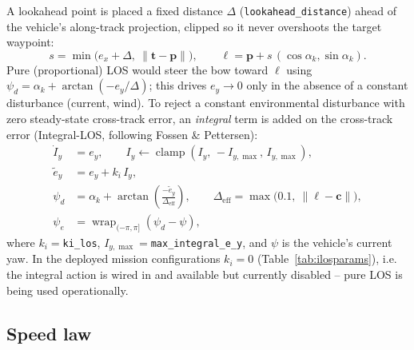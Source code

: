 A lookahead point is placed a fixed distance $\Delta$ (\texttt{lookahead\_distance}) ahead of the vehicle's along-track projection, clipped so it never overshoots the target waypoint:
\begin{equation}
s = \min\!\big(e_x + \Delta,\ \|\mathbf{t}-\mathbf{p}\|\big), \qquad \mathbf{\ell} = \mathbf{p} + s\,(\cos\alpha_k,\sin\alpha_k).
\end{equation}
Pure (proportional) LOS would steer the bow toward $\boldsymbol\ell$ using $\psi_d = \alpha_k + \arctan(-e_y/\Delta)$; this drives $e_y\to 0$ only in the absence of a constant disturbance (current, wind). To reject a constant environmental disturbance with zero steady-state cross-track error, an \emph{integral} term is added on the cross-track error (Integral-LOS, following Fossen \& Pettersen):
\begin{align}
\dot I_y &= e_y, \qquad I_y \leftarrow \operatorname{clamp}(I_y,\, -I_{y,\max},\, I_{y,\max}), \label{eq:ilosint}\\
\tilde e_y &= e_y + k_i\, I_y, \label{eq:ilosaug}\\
\psi_d &= \alpha_k + \arctan\!\left(\frac{-\tilde e_y}{\Delta_{\text{eff}}}\right), \qquad \Delta_{\text{eff}} = \max\big(0.1,\ \|\boldsymbol\ell - \mathbf{c}\|\big), \label{eq:iloslaw}\\
\psi_e &= \operatorname{wrap}_{(-\pi,\pi]}(\psi_d - \psi), \label{eq:heading_err}
\end{align}
where $k_i=$\texttt{ki\_los}, $I_{y,\max}=$\texttt{max\_integral\_e\_y}, and $\psi$ is the vehicle's current yaw. In the deployed mission configurations $k_i=0$ (Table~\ref{tab:ilosparams}), i.e. the integral action is wired in and available but currently disabled -- pure LOS is being used operationally. 

\subsection{Speed law}

